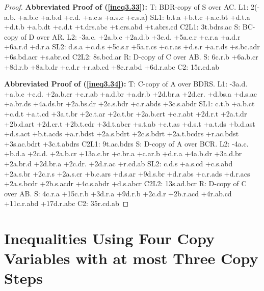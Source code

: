 \documentclass[10pt,journal]{IEEEtran}
\begin{document}
\begin{proof}
{\bf Abbreviated Proof of (\ref{ineq3.33}):}
T: BDR-copy of S over AC.\newline
L1: 2(-a.b. +a.b.c +a.b.d +c.d. +a.c.s +a.s.c +c.s.a)\newline
SL1: b.t.a +b.t.c +a.c.bt +d.t.a +d.t.b +a.b.dt +c.d.t +t.drs.abc +t.crs.abd +t.abrs.cd
C2L1: 3t.bdrs.ac\newline
S: BC-copy of D over AR.\newline
L2: -3a.c. +2a.b.c +2a.d.b +3c.d. +5a.c.r +c.r.a +a.d.r +6a.r.d +d.r.a\newline
SL2: d.s.a +c.d.s +5c.s.r +5a.r.cs +c.r.as +d.s.r +a.r.ds +s.bc.adr +6s.bd.acr +s.abr.cd\newline
C2L2: 8s.bcd.ar\newline
R: D-copy of C over AB.\newline
S: 6c.r.b +6a.b.cr +8d.r.b +8a.b.dr +c.d.r +r.ab.cd +8c.r.abd +6d.r.abc\newline
C2: 15r.cd.ab\newline


{\bf Abbreviated Proof of (\ref{ineq3.34}):}
T: C-copy of A over BDRS.\newline
L1: -3a.d. +a.b.c +c.d. +2a.b.cr +c.r.ab +a.d.br +a.dr.b +2d.br.a +2d.cr. +d.bs.a +d.s.ac +a.br.ds +4a.ds.br +2a.bs.dr +2c.s.bdr +c.r.abds +3c.s.abdr\newline
SL1: c.t.b +a.b.ct +c.d.t +a.t.cd +3a.t.br +2c.t.ar +2c.t.br +2a.b.crt +c.r.abt +2d.r.t +2a.t.dr +2b.d.art +2d.cr.t +2b.t.cdr +3d.t.abcr +s.t.ab +c.t.as +d.s.t +a.t.ds +b.d.ast +d.s.act +b.t.acds +a.r.bdst +2a.s.bdrt +2c.s.bdrt +2a.t.bcdrs +r.ac.bdst +3s.ac.bdrt +3c.t.abdrs
C2L1: 9t.ac.bdrs\newline
S: D-copy of A over BCR.\newline
L2: -4a.c. +b.d.a +2c.d. +2a.b.cr +13a.c.br +c.br.a +c.ar.b +d.r.a +4a.b.dr +3a.d.br +2a.br.d +2d.br.a +2c.dr. +2d.r.ac +r.cd.ab\newline
SL2: c.d.s +a.s.cd +c.s.abd +2a.s.br +2c.r.s +2a.s.cr +b.c.ars +d.s.ar +9d.s.br +d.r.abs +c.r.ads +d.r.acs +2a.s.bcdr +2b.s.acdr +4c.s.abdr +d.s.abcr\newline
C2L2: 13s.ad.bcr\newline
R: D-copy of C over AB.\newline
S: 4c.r.a +15c.r.b +3d.r.a +9d.r.b +2c.d.r +2b.r.acd +4r.ab.cd +11c.r.abd +17d.r.abc\newline
C2: 35r.cd.ab\newline

\end{proof}
\section{Inequalities Using Four Copy Variables with at most Three Copy Steps}\label{FourCopies}
\end{document}
